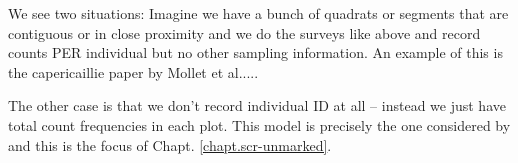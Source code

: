 We see two situations:
Imagine we have a bunch of quadrats or segments that are contiguous or
in close proximity
and we do the surveys like above and record counts PER individual  but
no other sampling information. An example of this is the capericaillie
paper by Mollet et al.....

The other case is that we don't record individual ID at all -- instead
we just have total count frequencies in each plot.
This model is precisely the one considered by
\citep{chandler_royle:2012} and this is the focus of
Chapt. \ref{chapt.scr-unmarked}.

